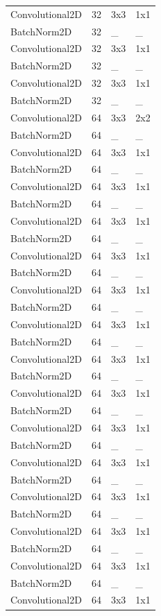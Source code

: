 \begin{center}
\begin{longtable}{|l|l|l|l|}
		Convolutional2D & 32 & 3x3 & 1x1 \\
		BatchNorm2D & 32 & \_ & \_ \\
		Convolutional2D & 32 & 3x3 & 1x1 \\
		BatchNorm2D & 32 & \_ & \_ \\
		Convolutional2D & 32 & 3x3 & 1x1 \\
		BatchNorm2D & 32 & \_ & \_ \\
		Convolutional2D & 64 & 3x3 & 2x2 \\
		BatchNorm2D & 64 & \_ & \_ \\
		Convolutional2D & 64 & 3x3 & 1x1 \\
		BatchNorm2D & 64 & \_ & \_ \\
		Convolutional2D & 64 & 3x3 & 1x1 \\
		BatchNorm2D & 64 & \_ & \_ \\
		Convolutional2D & 64 & 3x3 & 1x1 \\
		BatchNorm2D & 64 & \_ & \_ \\
		Convolutional2D & 64 & 3x3 & 1x1 \\
		BatchNorm2D & 64 & \_ & \_ \\
		Convolutional2D & 64 & 3x3 & 1x1 \\
		BatchNorm2D & 64 & \_ & \_ \\
		Convolutional2D & 64 & 3x3 & 1x1 \\
		BatchNorm2D & 64 & \_ & \_ \\
		Convolutional2D & 64 & 3x3 & 1x1 \\
		BatchNorm2D & 64 & \_ & \_ \\
		Convolutional2D & 64 & 3x3 & 1x1 \\
		BatchNorm2D & 64 & \_ & \_ \\
		Convolutional2D & 64 & 3x3 & 1x1 \\
		BatchNorm2D & 64 & \_ & \_ \\
		Convolutional2D & 64 & 3x3 & 1x1 \\
		BatchNorm2D & 64 & \_ & \_ \\
		Convolutional2D & 64 & 3x3 & 1x1 \\
		BatchNorm2D & 64 & \_ & \_ \\
		Convolutional2D & 64 & 3x3 & 1x1 \\
		BatchNorm2D & 64 & \_ & \_ \\
		Convolutional2D & 64 & 3x3 & 1x1 \\
		BatchNorm2D & 64 & \_ & \_ \\
		Convolutional2D & 64 & 3x3 & 1x1 \\

\end{longtable}
\end{center}
